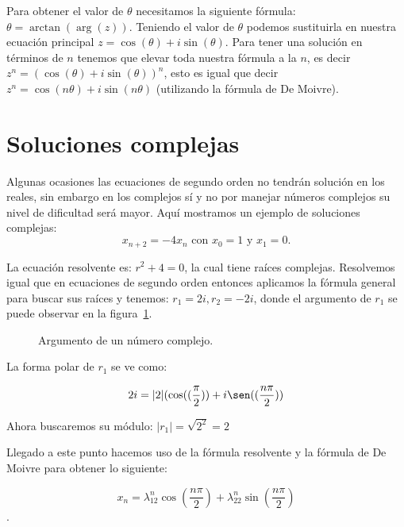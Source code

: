\documentclass{report}
\begin{document}
Para obtener el valor de $\theta$
necesitamos la siguiente fórmula: $\theta=\arctan(\arg(z))$. Teniendo el
valor de $\theta$ podemos sustituirla en nuestra ecuación principal
$z=\cos(\theta)+i\sin(\theta)$. Para tener una solución en términos de
$n$ tenemos que elevar toda nuestra fórmula a la $n$, es decir
$z^n=(\cos(\theta)+i\sin(\theta))^n$, esto es igual que decir
$z^n=\cos(n\theta)+i\sin(n\theta)$ (utilizando la fórmula de De Moivre).

\section{Soluciones complejas}
\label{sec:complejas}

Algunas ocasiones las ecuaciones de segundo orden no tendrán solución
en los reales, sin embargo en los complejos sí y no por manejar
números complejos su nivel de dificultad será mayor. Aquí mostramos un
ejemplo de soluciones complejas:
\begin{equation}
  \label{eq:20}
  x_{n+2}=-4x_{n} \text{ con }  x_0=1 \text{ y } x_1=0.
\end{equation}


La ecuación resolvente es: $r^2+4=0$, la cual tiene raíces complejas.
Resolvemos igual que en ecuaciones de segundo orden entonces aplicamos
la fórmula general para buscar sus raíces y tenemos: $r_1=2i,r_2=-2i$, donde el argumento de $r_1$ se puede observar en la figura~\ref{argum}.
\begin{figure}[htp]
\centering
{}
\caption{Argumento de un número complejo.}
\label{argum}
\end{figure}

La forma polar de $r_1$ se ve como:


$$2i=|2|(\cos((\frac{\pi}{2}))+i\sen((\frac{n\pi}{2}))$$

Ahora buscaremos su módulo: $|r_{1}|=\sqrt{2^2}=2$

Llegado a este punto hacemos uso de la fórmula resolvente y la fórmula de De Moivre para obtener lo siguiente:

$$x_n=\lambda_12^n\cos(\frac{n\pi}{2})+\lambda_22^n\sin(\frac{n\pi}{2})$$.
\end{document}
